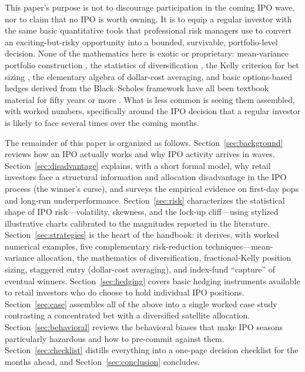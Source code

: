 \documentclass[conference]{IEEEtran}
\begin{document}
This paper's purpose is not to discourage participation in the coming IPO wave, nor to claim that no IPO is worth owning. It is to equip a regular investor with the same basic quantitative tools that professional risk managers use to convert an exciting-but-risky opportunity into a bounded, survivable, portfolio-level decision. None of the mathematics here is exotic or proprietary: mean-variance portfolio construction \cite{markowitz1952}, the statistics of diversification \cite{benartzithaler2001}, the Kelly criterion for bet sizing \cite{kelly1956}, the elementary algebra of dollar-cost averaging, and basic options-based hedges derived from the Black--Scholes framework \cite{blackscholes1973} have all been textbook material for fifty years or more \cite{bodiekanemarcus}. What is less common is seeing them assembled, with worked numbers, specifically around the IPO decision that a regular investor is likely to face several times over the coming months.

The remainder of this paper is organized as follows. Section~\ref{sec:background} reviews how an IPO actually works and why IPO activity arrives in waves. Section~\ref{sec:disadvantage} explains, with a short formal model, why retail investors face a structural information and allocation disadvantage in the IPO process (the winner's curse), and surveys the empirical evidence on first-day pops and long-run underperformance. Section~\ref{sec:risk} characterizes the statistical shape of IPO risk---volatility, skewness, and the lock-up cliff---using stylized illustrative charts calibrated to the magnitudes reported in the literature. Section~\ref{sec:strategies} is the heart of the handbook: it derives, with worked numerical examples, five complementary risk-reduction techniques---mean-variance allocation, the mathematics of diversification, fractional-Kelly position sizing, staggered entry (dollar-cost averaging), and index-fund ``capture'' of eventual winners. Section~\ref{sec:hedging} covers basic hedging instruments available to retail investors who do choose to hold individual IPO positions. Section~\ref{sec:case} assembles all of the above into a single worked case study contrasting a concentrated bet with a diversified satellite allocation. Section~\ref{sec:behavioral} reviews the behavioral biases that make IPO seasons particularly hazardous and how to pre-commit against them. Section~\ref{sec:checklist} distills everything into a one-page decision checklist for the months ahead, and Section~\ref{sec:conclusion} concludes.
\end{document}
